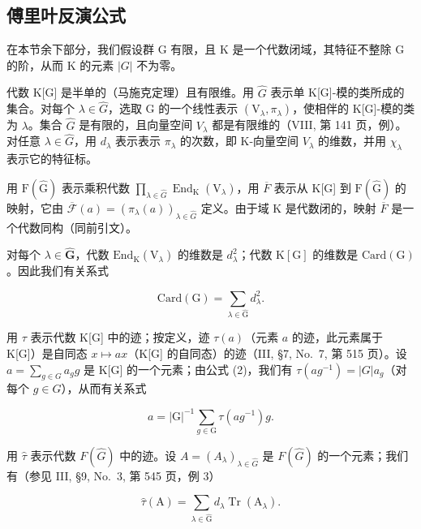 \subsection{傅里叶反演公式}

在本节余下部分，我们假设群 G 有限，且 K 是一个代数闭域，其特征不整除 G 的阶，从而 K 的元素 \(|G|\) 不为零。

代数 K{[}G{]} 是半单的（马施克定理）且有限维。用 \(\widehat{G}\) 表示单 K{[}G{]}-模的类所成的集合。对每个 \(\lambda\in\widehat{G}\)，选取 G 的一个线性表示 \((\mathrm{V}_{\lambda},\pi_{\lambda})\)，使相伴的 K{[}G{]}-模的类为 \(\lambda\)。集合 \(\widehat{G}\) 是有限的，且向量空间 \(V_{\lambda}\) 都是有限维的（VIII, 第 141 页，例）。对任意 \(\lambda\in\widehat{G}\)，用 \(d_{\lambda}\) 表示表示 \(\pi_{\lambda}\) 的次数，即 K-向量空间 \(V_{\lambda}\) 的维数，并用 \(\chi_{\lambda}\) 表示它的特征标。

用 \(\mathrm{F}(\widehat{\mathrm{G}})\) 表示乘积代数 \(\prod_{\lambda\in\widehat{G}}\operatorname{End}_{\mathrm{K}}(\mathrm{V}_{\lambda})\)，用 \(\overline{F}\) 表示从 K{[}G{]} 到 \(\mathrm{F}(\widehat{\mathrm{G}})\) 的映射，它由 \(\overline{\mathcal{F}}(a)=(\pi_{\lambda}(a))_{\lambda\in\widehat{G}}\) 定义。由于域 K 是代数闭的，映射 \(\overline{F}\) 是一个代数同构（同前引文）。

对每个 \(\lambda \in \widehat{\mathbf{G}}\)，代数 \(\mathrm{End}_{\mathrm{K}}(\mathrm{V}_{\lambda})\) 的维数是 \(d_{\lambda}^{2}\)；代数 \(\mathrm{K}[\mathrm{G}]\) 的维数是 \(\mathrm{Card}(\mathrm{G})\)。因此我们有关系式

\[
\mathrm{Card(G)} = \sum_ {\lambda \in \widehat {\mathrm{G}}} d _ {\lambda} ^ {2}.\tag{8}
\]

用 \(\tau\) 表示代数 K{[}G{]} 中的迹；按定义，迹 \(\tau(a)\)（元素 \(a\) 的迹，此元素属于 K{[}G{]}）是自同态 \(x \mapsto ax\)（K{[}G{]} 的自同态）的迹（III, §7, No.~7, 第 515 页）。设 \(a = \sum_{g \in G} a_g g\) 是 K{[}G{]} 的一个元素；由公式 (2)，我们有 \(\tau(ag^{-1}) = |G| a_g\)（对每个 \(g \in G\)），从而有关系式

\[
a = | \mathrm{G} | ^ {- 1} \sum_ {g \in \mathrm{G}} \tau (a g ^ {- 1}) g.\tag{9}
\]

用 \(\widehat{\tau}\) 表示代数 \(F(\widehat{G})\) 中的迹。设 \(A = (A_{\lambda})_{\lambda \in \widehat{G}}\) 是 \(F(\widehat{G})\) 的一个元素；我们有（参见 III, §9, No.~3, 第 545 页，例 3）

\[
\widehat {\tau} (\mathrm{A}) = \sum_ {\lambda \in \widehat {\mathrm{G}}} d _ {\lambda} \operatorname{Tr} (\mathrm{A} _ {\lambda}).\tag{10}
\]

